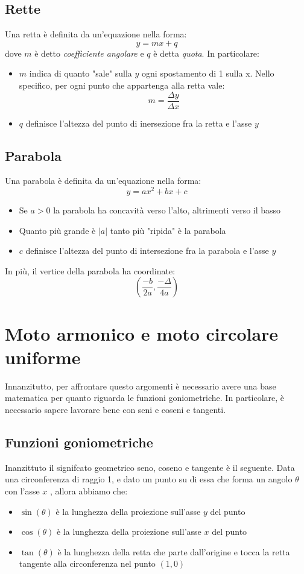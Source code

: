 \subsection{Rette}
Una retta è definita da un'equazione nella forma:
\[
	y = mx + q
\]
dove $ m $ è detto \textit{coefficiente angolare} e  $ q $ è detta \textit{quota}. In particolare:
\begin{itemize}
	\item $ m $ indica di quanto "sale" sulla $ y $ ogni spostamento di 1 sulla x. Nello specifico, per ogni punto che appartenga alla retta vale:
	      \[
		      m = \frac{\Delta y}{\Delta x}
	      \]
	\item $ q $ definisce l'altezza del punto di inersezione fra la retta e l'asse $ y $
\end{itemize}
\subsection{Parabola}
Una parabola è definita da un'equazione nella forma:
\[
	y = ax^2 + bx + c
\]
\begin{itemize}
	\item Se $ a > 0 $ la parabola ha concavità verso l'alto, altrimenti verso il basso
	\item Quanto più grande è $ \left|a\right| $ tanto più "ripida" è la parabola
	\item $ c $ definisce l'altezza del punto di intersezione fra la parabola e l'asse $ y $
\end{itemize}
In più, il vertice della parabola ha coordinate:
\[
	\left(\frac{-b}{2a}, \frac{-\Delta }{4a}\right)
\]

\section{Moto armonico e moto circolare uniforme}
Innanzitutto, per affrontare questo argomenti è necessario avere una base matematica per quanto riguarda le funzioni goniometriche. In particolare, è necessario sapere lavorare bene con seni e coseni e tangenti.
\subsection{Funzioni goniometriche}
Inanzittuto il signifcato geometrico seno, coseno e tangente è il seguente. Data una circonferenza di raggio 1, e dato un punto su di essa che forma un angolo $ \theta $ con l'asse $ x $ , allora abbiamo che:
\begin{itemize}
	\item $ \sin \left(\theta \right) $ è la lunghezza della proiezione sull'asse $ y $ del punto
	\item $ \cos  \left(\theta \right) $ è la lunghezza della proiezione sull'asse $ x $ del punto
	\item $ \tan \left(\theta \right) $ è la lunghezza della retta che parte dall'origine e tocca la retta tangente alla circonferenza nel punto $ \left(1,0\right) $
\end{itemize}

